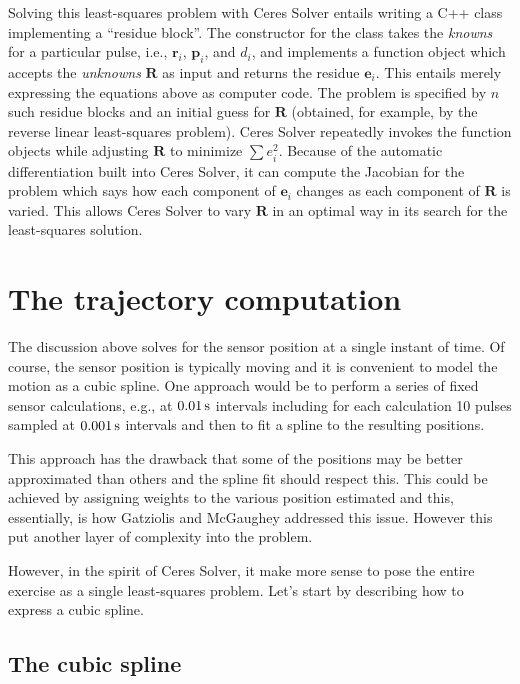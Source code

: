 \documentclass
[rmp,reprint,
twocolumn,amsmath,showkeys,letterpaper,raggedbottom]{revtex4-2}
\begin{document}
Solving this least-squares problem with Ceres Solver entails writing a
C++ class implementing a ``residue block''.  The constructor for the
class takes the {\it knowns} for a particular pulse, i.e., $\mathbf
r_i$, $\mathbf p_i$, and $d_i$, and implements a function object
which accepts the {\it unknowns} $\mathbf R$ as input and returns the
residue $\mathbf e_i$.  This entails merely expressing the equations
above as computer code.  The problem is specified by $n$ such
residue blocks and an initial guess for $\mathbf R$ (obtained, for
example, by the reverse linear least-squares problem).  Ceres Solver
repeatedly invokes the function objects while adjusting $\mathbf R$
to minimize $\sum e_i^2$.  Because of the automatic differentiation
built into Ceres Solver, it can compute the Jacobian for the problem
which says how each component of $\mathbf e_i$ changes as each
component of $\mathbf R$ is varied.  This allows Ceres Solver to
vary $\mathbf R$ in an optimal way in its search for the
least-squares solution.

\section{The trajectory computation}

The discussion above solves for the sensor position at a single instant
of time.  Of course, the sensor position is typically moving and it is
convenient to model the motion as a cubic spline.  One approach would be
to perform a series of fixed sensor calculations, e.g., at
$0.01\,\text s$ intervals including for each calculation 10 pulses
sampled at $0.001\,\text s$ intervals and then to fit a spline to
the resulting positions.

This approach has the drawback that some of the positions may be better
approximated than others and the spline fit should respect this.  This
could be achieved by assigning weights to the various position estimated
and this, essentially, is how Gatziolis and McGaughey addressed this
issue.  However this put another layer of complexity into the problem.

However, in the spirit of Ceres Solver, it make more sense to pose the
entire exercise as a single least-squares problem.  Let's start by
describing how to express a cubic spline.

\subsection{The cubic spline}
\end{document}
